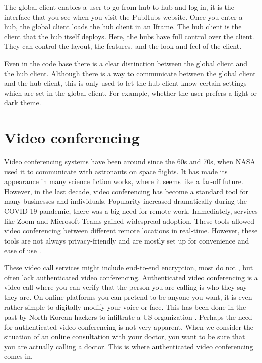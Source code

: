 \documentclass{report}
\begin{document}
The global client enables a user to go from hub to hub and log in, it is
the interface that you see when you visit the PubHubs website.
Once you enter a hub, the global client loads the hub client in an Iframe. The hub client
is the client that the hub itself deploys. Here, the hubs have full control
over the client. They can control the layout, the features, and the look and feel of the client.

Even in the code base there is a clear distinction between the global client and the hub client.
Although there is a way to communicate between the global client and the hub client, this
is only used to let the hub client know certain settings which are set in the global client.
For example, whether the user prefers a light or dark theme.


\section{Video conferencing}
Video conferencing systems have been around since the 60s and 70s, when NASA used it to communicate with astronauts
on space flights. It has made its appearance in many science fiction works, where it seems like a far-off future.
However, in the last decade, video conferencing has become a standard tool for many businesses and individuals.
Popularity increased dramatically during the COVID-19 pandemic, there was a big need for remote work. Immediately,
services like Zoom \cite{noauthor_one_nodate} and Microsoft Teams  \cite{noauthor_microsoft_nodate} gained
widespread adoption. These tools allowed video conferencing between different remote locations in real-time.
However, these tools are not always privacy-friendly and are mostly set up for convenience and ease of use \cite{gauthier_dynamic_2021}.

These video call services might include end-to-end encryption, most do not \cite{gauthier_dynamic_2021}, but often lack authenticated video
conferencing. Authenticated video conferencing is a video call where you can verify that the person you are calling is who they say they are.
On online platforms you can pretend to be anyone you want, it is even rather simple to digitally
modify your voice or face. This has been done in the past by North Korean hackers to infiltrate a US organization \cite{
noauthor_how_nodate}. Perhaps the need for authenticated video conferencing is not very apparent. When we consider
the situation of an online consultation with your doctor, you want to be sure that you are actually calling a doctor. This is
where authenticated video conferencing comes in.
\end{document}
